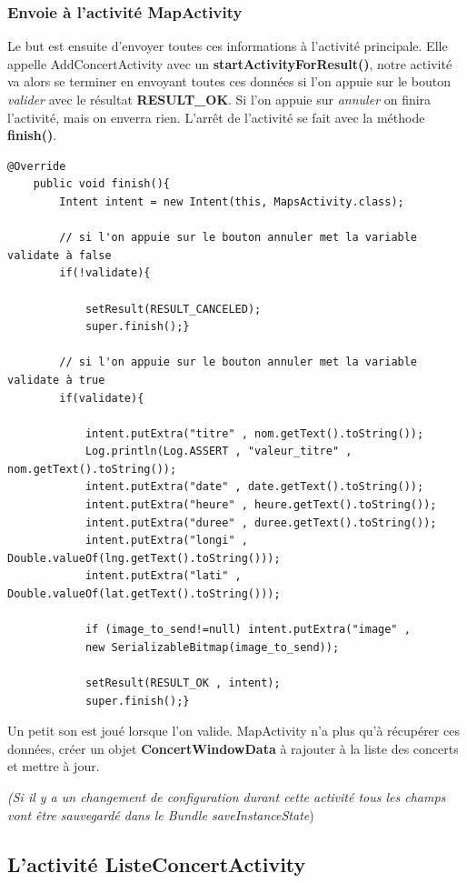 \documentclass{article}
\begin{document}
\subsubsection{Envoie à l'activité MapActivity}
Le but est ensuite d'envoyer toutes ces informations à l'activité principale. Elle appelle AddConcertActivity avec un \textbf{startActivityForResult()}, notre activité va alors se terminer en envoyant toutes ces données si l'on appuie sur le bouton \textit{valider} avec le résultat \textbf{RESULT\_OK}. Si l'on appuie sur \textit{annuler} on finira l'activité, mais on enverra rien. L'arrêt de l'activité se fait avec la méthode \textbf{finish()}.
\begin{verbatim}
@Override
    public void finish(){
		Intent intent = new Intent(this, MapsActivity.class);

		// si l'on appuie sur le bouton annuler met la variable validate à false
        if(!validate){

            setResult(RESULT_CANCELED);
            super.finish();}

		// si l'on appuie sur le bouton annuler met la variable validate à true
        if(validate){

            intent.putExtra("titre" , nom.getText().toString());
            Log.println(Log.ASSERT , "valeur_titre" , nom.getText().toString());
            intent.putExtra("date" , date.getText().toString());
            intent.putExtra("heure" , heure.getText().toString());
            intent.putExtra("duree" , duree.getText().toString());
            intent.putExtra("longi" , Double.valueOf(lng.getText().toString()));
            intent.putExtra("lati" , Double.valueOf(lat.getText().toString()));

            if (image_to_send!=null) intent.putExtra("image" , 
            new SerializableBitmap(image_to_send));

            setResult(RESULT_OK , intent);
            super.finish();}
\end{verbatim}
\vspace{1\baselineskip}
Un petit son est joué lorsque l'on valide.
MapActivity n'a plus qu'à récupérer ces données, créer un objet \textbf{ConcertWindowData} à rajouter à la liste des concerts et mettre à jour.
\vspace{1\baselineskip}

\textit{(Si il y a un changement de configuration durant cette activité tous les champs vont être sauvegardé dans le Bundle saveInstanceState})
\subsection{L'activité ListeConcertActivity}
\end{document}
